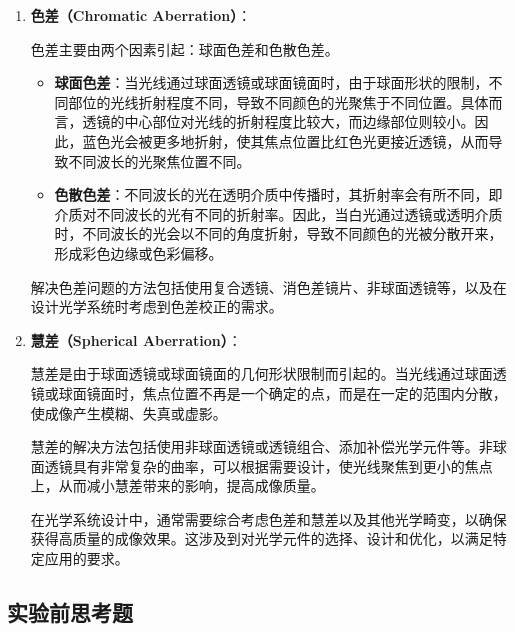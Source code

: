 \documentclass[dvipsnames, svgnames,a4paper,11pt]{article}
\begin{document}
\begin{enumerate}
    \item \textbf{色差（Chromatic Aberration）}：
    
    色差主要由两个因素引起：球面色差和色散色差。
    
    \begin{itemize}
        \item \textbf{球面色差}：当光线通过球面透镜或球面镜面时，由于球面形状的限制，不同部位的光线折射程度不同，导致不同颜色的光聚焦于不同位置。具体而言，透镜的中心部位对光线的折射程度比较大，而边缘部位则较小。因此，蓝色光会被更多地折射，使其焦点位置比红色光更接近透镜，从而导致不同波长的光聚焦位置不同。
        
        \item \textbf{色散色差}：不同波长的光在透明介质中传播时，其折射率会有所不同，即介质对不同波长的光有不同的折射率。因此，当白光通过透镜或透明介质时，不同波长的光会以不同的角度折射，导致不同颜色的光被分散开来，形成彩色边缘或色彩偏移。
    \end{itemize}
    
    解决色差问题的方法包括使用复合透镜、消色差镜片、非球面透镜等，以及在设计光学系统时考虑到色差校正的需求。
    
    \item \textbf{慧差（Spherical Aberration）}：
    
    慧差是由于球面透镜或球面镜面的几何形状限制而引起的。当光线通过球面透镜或球面镜面时，焦点位置不再是一个确定的点，而是在一定的范围内分散，使成像产生模糊、失真或虚影。
    
    慧差的解决方法包括使用非球面透镜或透镜组合、添加补偿光学元件等。非球面透镜具有非常复杂的曲率，可以根据需要设计，使光线聚焦到更小的焦点上，从而减小慧差带来的影响，提高成像质量。
    
在光学系统设计中，通常需要综合考虑色差和慧差以及其他光学畸变，以确保获得高质量的成像效果。这涉及到对光学元件的选择、设计和优化，以满足特定应用的要求。

\end{enumerate}



	
	
	
	\subsection{实验前思考题}
	
\end{document}
